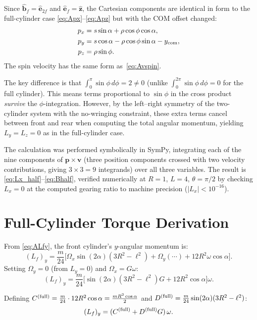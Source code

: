 \documentclass[11pt]{article}
\newcommand{\vect}[1]{\bm{#1}}
\newcommand{\uv}[1]{\hat{\bm{#1}}}
\newcommand{\zhat}{\uv{z}}
\newcommand{\bfh}{\uv{b}_{\!f}}
\newcommand{\efh}{\uv{e}_{\!f}}
\begin{document}
Since $\bfh=\uv{e}_{2f}$ and $\efh=\zhat$, the Cartesian components
are identical in form to the full-cylinder case
\eqref{eq:Apx}--\eqref{eq:Apz} but with the COM offset changed:
\begin{align}
p_x &= s\sin\alpha+\rho\cos\phi\cos\alpha, \\
p_y &= s\cos\alpha-\rho\cos\phi\sin\alpha-y_{\rm com}, \\
p_z &= \rho\sin\phi.
\end{align}
The spin velocity has the same form as~\eqref{eq:Avspin}.

The key difference is that
$\int_0^\pi\sin\phi\,d\phi=2\neq0$ (unlike
$\int_0^{2\pi}\sin\phi\,d\phi=0$ for the full cylinder).  This means
terms proportional to $\sin\phi$ in the cross product \emph{survive}
the $\phi$-integration.  However, by the left--right symmetry of the
two-cylinder system with the no-wringing constraint, these extra terms
cancel between front and rear when computing the total angular
momentum, yielding $L_y=L_z=0$ as in the full-cylinder case.

The calculation was performed symbolically in SymPy, integrating each
of the nine components of $\vect{p}\times\vect{v}$ (three position
components crossed with two velocity contributions, giving
$3\times3=9$ integrands) over all three variables.  The result is
\eqref{eq:Lx_half}--\eqref{eq:Bhalf}, verified numerically at
$R=1$, $L=4$, $\theta=\pi/2$ by checking $L_x=0$ at the computed
gearing ratio to machine precision ($|L_x|<10^{-16}$).

\section{Full-Cylinder Torque Derivation}
\label{app:torque_full}

From \eqref{eq:ALfy}, the front cylinder's $y$-angular momentum is:
\begin{equation}
(L_f)_y = \frac{m}{24}\bigl[
  \Omega_x\sin(2\alpha)(3R^2-\ell^2)
  +\Omega_y(\cdots)
  +12R^2\omega\cos\alpha\bigr].
\end{equation}
Setting $\Omega_y=0$ (from $L_y=0$) and $\Omega_x=G\omega$:
\begin{equation}
(L_f)_y = \frac{m}{24}\bigl[\sin(2\alpha)(3R^2-\ell^2)G+12R^2\cos\alpha\bigr]\omega.
\end{equation}

Defining $C^{(\rm full)}=\frac{m}{24}\cdot12R^2\cos\alpha
=\frac{mR^2\cos\alpha}{2}$ and
$D^{(\rm full)}=\frac{m}{24}\sin(2\alpha)(3R^2-\ell^2)$:
\begin{equation}
(L_f)_y = (C^{(\rm full)}+D^{(\rm full)}G)\,\omega.
\end{equation}
\end{document}
